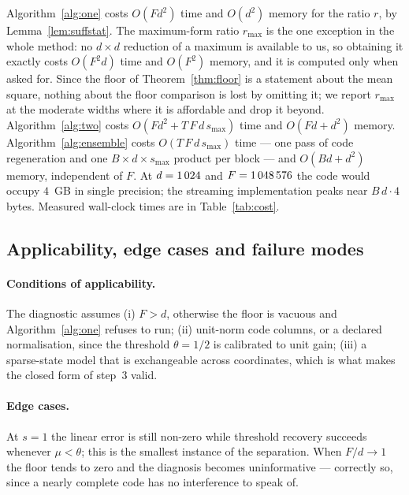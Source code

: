 Algorithm~\ref{alg:one} costs $O(Fd^2)$ time and $O(d^2)$ memory for the ratio $r$, by
Lemma~\ref{lem:suffstat}. The maximum-form ratio $r_{\max}$ is the one exception in the whole
method: no $d\times d$ reduction of a maximum is available to us, so obtaining it exactly costs
$O(F^2d)$ time and $O(F^2)$ memory, and it is computed only when asked for. Since the floor of
Theorem~\ref{thm:floor} is a statement about the mean square, nothing about the floor
comparison is lost by omitting it; we report $r_{\max}$ at the moderate widths where it is
affordable and drop it beyond. Algorithm~\ref{alg:two} costs $O(Fd^2+T\,F\,d\,s_{\max})$ time
and $O(Fd+d^2)$ memory. Algorithm~\ref{alg:ensemble} costs $O(T\,F\,d\,
s_{\max})$ time --- one pass of code regeneration and one $B\times d\times s_{\max}$ product
per block --- and $O(Bd+d^2)$ memory, independent of $F$. At $d=1\,024$ and
$F=1\,048\,576$ the code would occupy $4$~GB in single precision; the streaming implementation
peaks near $B\,d\cdot4$ bytes. Measured wall-clock times are in Table~\ref{tab:cost}.

\subsection{Applicability, edge cases and failure modes}

\paragraph{Conditions of applicability.} The diagnostic assumes (i) $F>d$, otherwise the floor
is vacuous and Algorithm~\ref{alg:one} refuses to run; (ii) unit-norm code columns, or a
declared normalisation, since the threshold $\theta=1/2$ is calibrated to unit gain;
(iii) a sparse-state model that is exchangeable across coordinates, which is what makes the
closed form of step~3 valid.

\paragraph{Edge cases.} At $s=1$ the linear error is still non-zero while threshold recovery
succeeds whenever $\mu<\theta$; this is the smallest instance of the separation. When
$F/d\to1$ the floor tends to zero and the diagnosis becomes uninformative --- correctly so,
since a nearly complete code has no interference to speak of.

